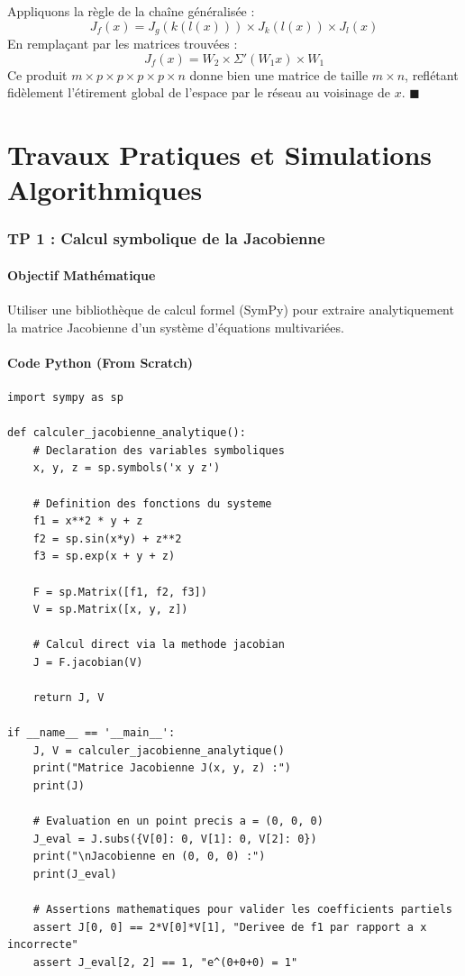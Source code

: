 \documentclass[11pt,a4paper]{article}
\begin{document}
Appliquons la règle de la chaîne généralisée :
$$ J_f(x) = J_g(k(l(x))) \times J_k(l(x)) \times J_l(x) $$
En remplaçant par les matrices trouvées :
$$ J_f(x) = W_2 \times \Sigma'(W_1 x) \times W_1 $$
Ce produit $m \times p \times p \times p \times p \times n$ donne bien une matrice de taille $m \times n$, reflétant fidèlement l'étirement global de l'espace par le réseau au voisinage de $x$.
$\blacksquare$

\newpage
\part{Travaux Pratiques et Simulations Algorithmiques}
\section*{TP 1 : Calcul symbolique de la Jacobienne}

\subsection*{Objectif Mathématique}
Utiliser une bibliothèque de calcul formel (SymPy) pour extraire analytiquement la matrice Jacobienne d'un système d'équations multivariées.

\subsection*{Code Python (From Scratch)}

\begin{lstlisting}
import sympy as sp

def calculer_jacobienne_analytique():
    # Declaration des variables symboliques
    x, y, z = sp.symbols('x y z')

    # Definition des fonctions du systeme
    f1 = x**2 * y + z
    f2 = sp.sin(x*y) + z**2
    f3 = sp.exp(x + y + z)

    F = sp.Matrix([f1, f2, f3])
    V = sp.Matrix([x, y, z])

    # Calcul direct via la methode jacobian
    J = F.jacobian(V)

    return J, V

if __name__ == '__main__':
    J, V = calculer_jacobienne_analytique()
    print("Matrice Jacobienne J(x, y, z) :")
    print(J)

    # Evaluation en un point precis a = (0, 0, 0)
    J_eval = J.subs({V[0]: 0, V[1]: 0, V[2]: 0})
    print("\nJacobienne en (0, 0, 0) :")
    print(J_eval)

    # Assertions mathematiques pour valider les coefficients partiels
    assert J[0, 0] == 2*V[0]*V[1], "Derivee de f1 par rapport a x incorrecte"
    assert J_eval[2, 2] == 1, "e^(0+0+0) = 1"
\end{lstlisting}
\end{document}

